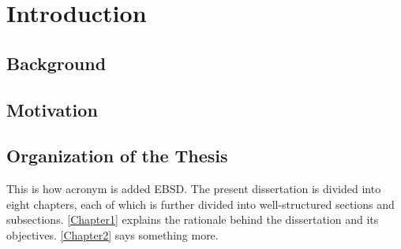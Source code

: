 
\chapter{Introduction} %

\label{Chapter1}



\section{Background}
\lipsum[2]
\section{Motivation}

\lipsum[2]

\section{Organization of the Thesis}

This is how acronym is added \ac{EBSD}. The present dissertation is divided into eight chapters, each of which is further divided into well-structured sections and subsections. \autoref{Chapter1} explains the rationale behind the dissertation and its objectives. \autoref{Chapter2} says something more. 
